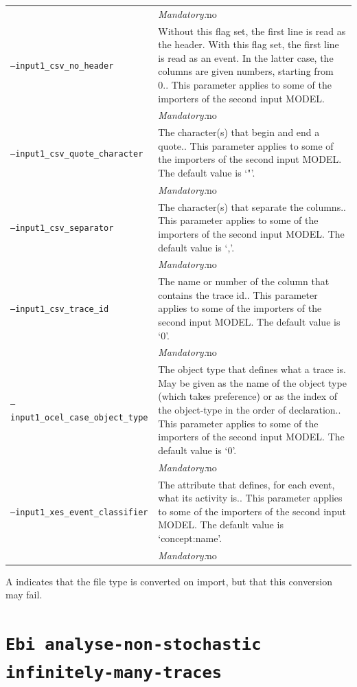 {\begin{tabularx}{\linewidth}{lX}
&\textit{Mandatory:}\quad no\\
\texttt{--input1\_csv\_no\_header} & Without this flag set, the first line is read as the header. 
    With this flag set, the first line is read as an event. In the latter case, the columns are given numbers, starting from 0.. This parameter applies to some of the importers of the second input MODEL. \\
&\textit{Mandatory:}\quad no\\
\texttt{--input1\_csv\_quote\_character} & The character(s) that begin and end a quote.. This parameter applies to some of the importers of the second input MODEL. The default value is `"'.\\
&\textit{Mandatory:}\quad no\\
\texttt{--input1\_csv\_separator} & The character(s) that separate the columns.. This parameter applies to some of the importers of the second input MODEL. The default value is `,'.\\
&\textit{Mandatory:}\quad no\\
\texttt{--input1\_csv\_trace\_id} & The name or number of the column that contains the trace id.. This parameter applies to some of the importers of the second input MODEL. The default value is `0'.\\
&\textit{Mandatory:}\quad no\\
\texttt{--input1\_ocel\_case\_object\_type} & The object type that defines what a trace is. May be given as the name of the object type (which takes preference) or as the index of the object-type in the order of declaration.. This parameter applies to some of the importers of the second input MODEL. The default value is `0'.\\
&\textit{Mandatory:}\quad no\\
\texttt{--input1\_xes\_event\_classifier} & The attribute that defines, for each event, what its activity is.. This parameter applies to some of the importers of the second input MODEL. The default value is `concept:name'.\\
&\textit{Mandatory:}\quad no\\
\bottomrule
\end{tabularx}
A \textdagger{} indicates that the file type is converted on import, but that this conversion may fail.
\clearpage\section{\texttt{Ebi analyse-non-stochastic infinitely-many-traces}}
\label{command:Ebi analyse-non-stochastic infinitely-many-traces}
}
